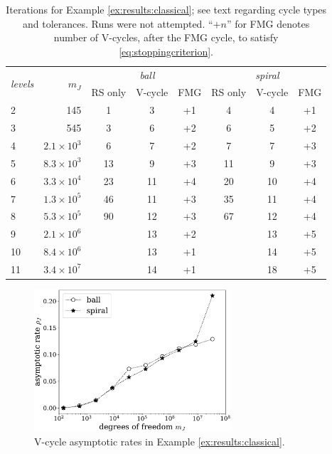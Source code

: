 \documentclass[review,hidelinks,onefignum,onetabnum,final]{siamart220329}  %
\newcommand{\XX}{\ding{55}}
\begin{document}
\begin{table}[ht]
\centering
\begin{tabular}{lr@{\hskip 7mm}cccccc}
\toprule
\multirow{2}{*}{\emph{levels}} & \multirow{2}{*}{$m_J$} & \multicolumn{3}{c}{\,\emph{ball}} & \multicolumn{3}{c}{\,\emph{spiral}} \\ \cmidrule(lr){3-5} \cmidrule(lr){6-8}
   &                  & RS only & V-cycle & FMG & RS only & V-cycle & FMG \\
\midrule
2 & 145 & 1 & 3 & +1 & 4 & 4 & +1 \\ 
3 & 545 & 3 & 6 & +2 & 6 & 5 & +2 \\ 
4 & $2.1\times 10^3$ & 6 & 7 & +2 & 7 & 7 & +3 \\ 
5 & $8.3\times 10^3$ & 13 & 9 & +3 & 11 & 9 & +3 \\ 
6 & $3.3\times 10^4$ & 23 & 11 & +4 & 20 & 10 & +4 \\ 
7 & $1.3\times 10^5$ & 46 & 11 & +3 & 35 & 11 & +4 \\ 
8 & $5.3\times 10^5$ & 90 & 12 & +3 & 67 & 12 & +4 \\ 
9 & $2.1\times 10^6$ & \XX & 13 & +2 & \XX & 13 & +5 \\ 
10 & $8.4\times 10^6$ & \XX & 13 & +1 & \XX & 14 & +5 \\ 
11 & $3.4\times 10^7$ & \XX & 14 & +1 & \XX & 18 & +5 \\ 
\bottomrule
\end{tabular}
\bigskip
\caption{Iterations for Example \ref{ex:results:classical}; see text regarding cycle types and tolerances.  Runs \XX\xspace were not attempted. ``$+n$'' for FMG denotes number of V-cycles, after the FMG cycle, to satisfy \eqref{eq:stoppingcriterion}.}
\label{tab:results:classical}
\end{table}

\begin{figure}[ht]
\centering
\includegraphics[width=0.65\textwidth]{asymprates.pdf}
\caption{V-cycle asymptotic rates in Example \ref{ex:results:classical}.}
\label{fig:results:asymp}
\end{figure}
\end{document}

